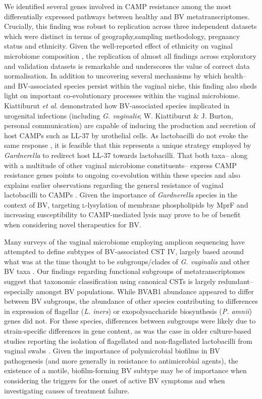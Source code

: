 \documentclass[sn-mathphys,Numbered]{sn-jnl}%
\begin{document}
We identified several genes involved in CAMP resistance among the most differentially expressed pathways between healthy and BV metatranscriptomes. Crucially, this finding was robust to replication across three independent datasets which were distinct in terms of geography,sampling methodology, pregnancy status and ethnicity. Given the well-reported effect of ethnicity on vaginal microbiome composition \citep{Ravel:2010, fettweis_ethnicity_2014}, the replication of almost all findings across exploratory and validation datasets is remarkable and underscores the value of correct data normalisation. In addition to uncovering several mechanisms by which health-- and BV-associated species persist within the vaginal niche, this finding also sheds light on important co-evolutionary processes within the vaginal microbiome. Kiattiburut \textit{et al.} \citep{Kiattiburut:2021} demonstrated how BV-associated species implicated in urogenital infections (including \textit{G. vaginalis}; W. Kiattiburut \& J. Burton, personal communication) are capable of inducing the production and secretion of host CAMPs such as LL-37 by urothelial cells. As lactobacilli do not evoke the same response \citep{Kiattiburut:2021}, it is feasible that this represents a unique strategy employed by \textit{Gardnerella} to redirect host LL-37 towards lactobacilli. That both taxa-- along with a multitude of other vaginal microbiome constituents-- express CAMP resistance genes points to ongoing co-evolution within these species and also explains earlier observations regarding the general resistance of vaginal lactobacilli to CAMPs \citep{smeianov_camps_2000}. Given the importance of \textit{Gardnerella} species in the context of BV, targeting \textsc{l}-lysylation of membrane phospholipids by MprF and increasing susceptibility to CAMP-mediated lysis may prove to be of benefit when considering novel therapeutics for BV.

Many surveys of the vaginal microbiome employing amplicon sequencing have attempted to define subtypes of BV-associated CST IV, largely based around what was at the time thought to be subgroups/clades of \textit{G. vaginalis} and other BV taxa \citep{freitas_vaginal_2017,romero_composition_2014}. Our findings regarding functional subgroups of metatranscriptomes suggest that taxonomic classification using canonical CSTs is largely redundant-- especially amongst BV populations. While BVAB1 abundance appeared to differ between BV subgroups, the abundance of other species contributing to differences in expression of flagellar (\textit{L. iners}) or exopolysaccharide biosynthesis (\textit{P. amnii}) genes did not. For these species, differences between subgroups were likely due to strain-specific differences in gene content, as was the case in older culture-based studies reporting the isolation of flagellated and non-flagellated lactobacilli from vaginal swabs \citep{mcgroarty_cell_1994}. Given the importance of polymicrobial biofilms in BV pathogenesis (and more generally in resistance to antimicrobial agents), the existence of a motile, biofilm-forming BV subtype may be of importance when considering the triggers for the onset of active BV symptoms and when investigating causes of treatment failure.
\end{document}
